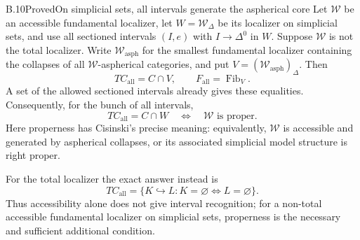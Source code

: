 \begin{claim}{B.10}{Proved}{On simplicial sets, all intervals generate the aspherical core}\label{B10}
Let $\mathcal W$ be an accessible fundamental localizer, let
$W=\mathcal W_\Delta$ be its localizer on simplicial sets, and use all
sectioned intervals $(I,e)$ with $I\to\Delta^0$ in $W$.
Suppose $\mathcal W$ is not the total localizer.  Write
$\mathcal W_{\mathrm{asph}}$ for the smallest fundamental localizer
containing the collapses of all $\mathcal W$-aspherical categories, and put
$V=(\mathcal W_{\mathrm{asph}})_\Delta$.  Then
\[
 TC_{\mathrm{all}}=C\cap V,
 \qquad F_{\mathrm{all}}=\operatorname{Fib}_V.
\]
A set of the allowed sectioned intervals already gives these equalities.
Consequently, for the bunch of all intervals,
\[
 TC_{\mathrm{all}}=C\cap W
 \quad\Longleftrightarrow\quad
 \mathcal W\text{ is proper}.
\]
Here properness has Cisinski's precise meaning: equivalently,
$\mathcal W$ is accessible and generated by aspherical collapses, or its
associated simplicial model structure is right proper.

For the total localizer the exact answer instead is
\[
 TC_{\mathrm{all}}
 =\{K\hookrightarrow L:K=\varnothing\Longleftrightarrow
                                  L=\varnothing\}.
\]
Thus accessibility alone does not give interval recognition; for a
non-total accessible fundamental localizer on simplicial sets, properness
is the necessary and sufficient additional condition.
\end{claim}
